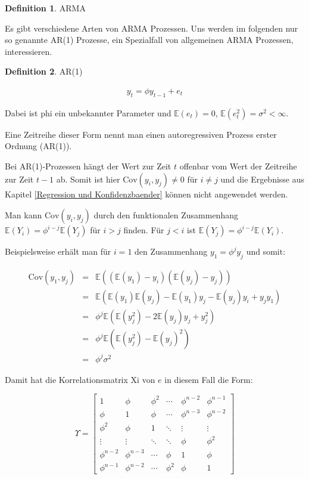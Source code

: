 \documentclass[12pt,a4paper]{article}
\theoremstyle{definition}
\newtheorem{Definition}{Definition}[subsection]
\theoremstyle{definition}
\theoremstyle{definition}
\theoremstyle{definition}
\begin{document}
\begin{Definition}
ARMA
\end{Definition}

Es gibt verschiedene Arten von ARMA Prozessen. Uns werden im folgenden nur so genannte AR(1) Prozesse, ein Spezialfall von allgemeinen ARMA Prozessen, interessieren.

\begin{Definition}
AR(1)

\begin{align}
y_t = \phi y_{t-1} + e_t
\end{align}

Dabei ist \gls{phi} ein unbekannter Parameter und $\mathbb{E}(e_t)=0$, $\mathbb{E}(e_t^2)=\sigma^2 < \infty$.

Eine Zeitreihe dieser Form nennt man einen autoregressiven Prozess erster Ordnung (AR(1)).
\end{Definition}

Bei AR(1)-Prozessen hängt der Wert zur Zeit $t$ offenbar vom Wert der Zeitreihe zur Zeit $t-1$ ab. Somit ist hier $\text{Cov}(y_i,y_j) \neq 0$ für $i \neq j$ und die Ergebnisse aus Kapitel \ref{Regression und Konfidenzbaender} können nicht angewendet werden. 

Man kann $\text{Cov}(y_i,y_j)$ durch den funktionalen Zusammenhang $\mathbb{E}(Y_i) = \phi^{i-j} \mathbb{E}(Y_{j})$ für $i>j$ finden. Für $j<i$ ist $\mathbb{E}(Y_j) = \phi^{i-j} \mathbb{E}(Y_i)$. 

Beispielsweise erhält man für $i=1$ den Zusammenhang $y_1 = \phi^j y_j$ und somit:

\begin{eqnarray*}
\text{Cov}(y_1, y_j) &=& \mathbb{E}((\mathbb{E}(y_1)-y_i)(\mathbb{E}(y_j)-y_j)) \\
&=& \mathbb{E}(\mathbb{E}(y_1)\mathbb{E}(y_j) - \mathbb{E}(y_1)y_j - \mathbb{E}(y_j)y_i +y_j y_1) \\
&=& \phi^j \mathbb{E}(\mathbb{E}(y_j^2) - 2 \mathbb{E}(y_j)y_j + y_j^2) \\
&=& \phi^j \mathbb{E}(\mathbb{E}(y_j^2)-\mathbb{E}(y_j)^2) \\
&=& \phi^j \sigma^2
\end{eqnarray*}

Damit hat die Korrelationsmatrix \gls{Xi} von $e$ in diesem Fall die Form:

\[
\Upsilon = 
\left[
   \begin{array}{cccccc}
     1 				& \phi 			& \phi^2	& \cdots	& \phi^{n-2}	& \phi^{n-1} 	\\
     \phi 			& 1		 		& \phi 		& \cdots	& \phi^{n-3}	& \phi^{n-2} 	\\
     \phi^2 		& \phi 			& 1		 	& \ddots	& \vdots		& \vdots 		\\
     \vdots		 	& \vdots	 	& \ddots	& \ddots	& \phi			& \phi^{2} 	\\
     \phi^{n-2} 	& \phi^{n-3}	& \cdots 	& \phi		& 1				& \phi 		\\
     \phi^{n-1} 	& \phi^{n-2} 	& \cdots	& \phi^{2}	& \phi			& 1  
   \end{array}
\right]
\]
\end{document}
